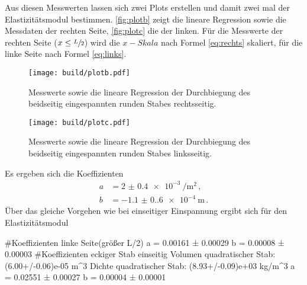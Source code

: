 Aus diesen Messwerten lassen sich zwei Plots erstellen und damit zwei mal der Elastizitätsmodul bestimmen.
\autoref{fig:plotb} zeigt die lineare Regression sowie die Messdaten der rechten Seite, \autoref{fig:plotc} 
die der linken. Für die Messwerte der rechten Seite ($x\leq\sfrac{L}{2}$) wird die $x-Skala$ nach Formel 
\eqref{eq:rechts} skaliert, für die linke Seite nach Formel \eqref{eq:links}.
\begin{figure}[H]
    \centering
    \label{fig:plotb}
    \caption{Messwerte sowie die lineare Regression der Durchbiegung des beidseitig eingespannten runden Stabes rechtsseitig.}
    \texttt{[image: build/plotb.pdf]}
\end{figure}
\begin{figure}[H]
    \centering
    \label{fig:plotc}
    \caption{Messwerte sowie die lineare Regression der Durchbiegung des beidseitig eingespannten runden Stabes linksseitig.}
    \texttt{[image: build/plotc.pdf]}
\end{figure}

Es ergeben sich die Koeffizienten 
\begin{align*}
    a&=\qty{2(0.4)e-3}{\per\meter\squared}\,,\\
    b&=\qty{-1.1(0.6)e-4}{\meter}\,.
\end{align*}
Über das gleiche Vorgehen wie bei einseitiger Einspannung ergibt sich für den Elastizitätsmodul

#Koeffizienten linke Seite(größer L/2)
a = 0.00161 ± 0.00029
b = 0.00008 ± 0.00003
#Koeffizienten eckiger Stab einseitig
Volumen quadratischer Stab:  (6.00+/-0.06)e-05 m^3
Dichte quadratischer Stab:  (8.93+/-0.09)e+03 kg/m^3
a = 0.02551 ± 0.00027
b = 0.00004 ± 0.00001